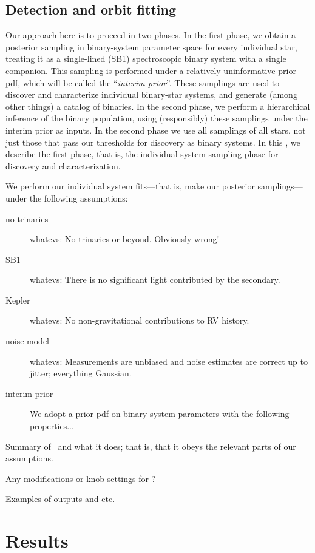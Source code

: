 \documentclass[modern, letterpaper]{aastex61}
\newcommand{\thejoker}{\project{The~Joker}}
\begin{document}

\subsection{Detection and orbit fitting}\label{sec:fitting}

Our approach here is to proceed in two phases.
In the first phase, we obtain a posterior sampling in binary-system
parameter space for every individual star, treating it as a
single-lined (SB1) spectroscopic binary system with a single
companion.
This sampling is performed under a relatively uninformative prior pdf,
which will be called the ``\emph{interim prior}''.
These samplings are used to discover and characterize individual binary-star
systems, and generate (among other things) a catalog of binaries.
In the second phase, we perform a hierarchical inference of the binary
population, using (responsibly) these samplings under the interim
prior as inputs.
In the second phase we use all samplings of all stars, not just those that
pass our thresholds for discovery as binary systems.
In this \sectionname, we describe the first phase, that is, the
individual-system sampling phase for discovery and characterization.

We perform our individual system fits---that is, make our posterior
samplings---under the following assumptions:
\begin{description}
\item[no trinaries] whatevs: No trinaries or beyond. Obviously wrong!
\item[SB1] whatevs: There is no significant light contributed by the secondary.
\item[Kepler] whatevs: No non-gravitational contributions to RV history.
\item[noise model] whatevs: Measurements are unbiased and noise estimates are correct up to jitter; everything Gaussian.
\item[interim prior] We adopt a prior pdf on binary-system parameters
  with the following properties...
\end{description}

Summary of \thejoker\ and what it does; that is, that it obeys the
relevant parts of our assumptions.

Any modifications or knob-settings for \thejoker?

Examples of outputs and etc.

\section{Results}
\end{document}
